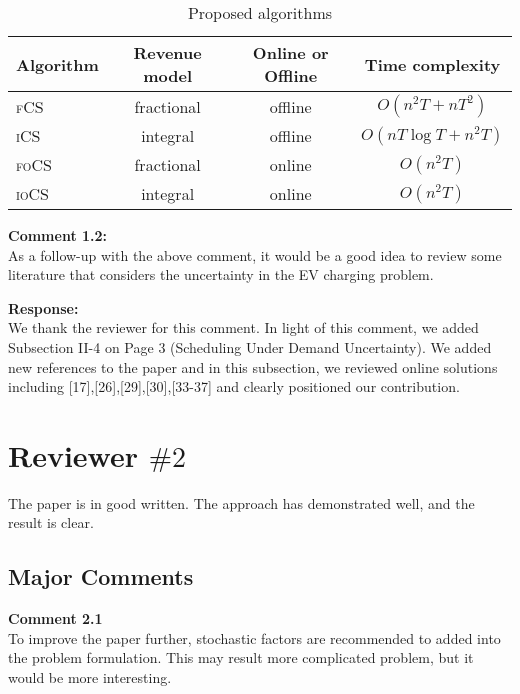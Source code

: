 \documentclass[11pt]{article}
\newcommand{\focs}{\textsc{foCS}\xspace}
\newcommand{\iocs}{\textsc{ioCS}\xspace}
\newcommand{\fcs}{\textsc{fCS}\xspace}
\newcommand{\ics}{\textsc{iCS}\xspace}
\begin{document}
	\begin{table}[h]
		\centering
		\vspace{3mm}
		\caption{Proposed algorithms}
		\label{tbl:tbl1}
		\begin{tabular}{ | l | c | c | c |}
			\hline
			\textbf{Algorithm} & Revenue model & Online or Offline & \textbf{Time complexity} \\ \hline\hline    
			\fcs& fractional& offline& $O(n^2T+nT^2)$\\\hline  
			\ics& integral& offline& $O(nT\log T+n^2T)$ \\\hline 
			\focs& fractional& online& $O(n^2T)$\\\hline 
			\iocs& integral&  online& $O(n^2T)$\\\hline
		\end{tabular}
	\end{table}
\vspace{5mm}
\renewcommand{\thetable}{\Alph{table}}
\vspace{4mm}
{\color{blue}
\noindent\textbf{Comment 1.2:}\\
 As a follow-up with the above comment, it would be a good idea to review some literature that considers the uncertainty in the EV charging problem.}

\vspace{7mm}
\noindent\textbf{Response:}\\
We thank the reviewer for this comment. In light of this comment, we added Subsection II-4 on Page $3$ (Scheduling Under Demand Uncertainty). We added new references to the paper and in this subsection, we reviewed online solutions including [17],[26],[29],[30],[33-37] and clearly positioned our contribution. 
\newpage
\section{Reviewer $\# 2$}
{\color{blue}The paper is in good written. The approach has demonstrated well, and the result is clear.}

\subsection{Major Comments}

\vspace{5mm}
{\color{blue}
\noindent\textbf{Comment 2.1}\\
To improve the paper further, stochastic factors are recommended to added into the problem formulation. This may result more complicated problem, but it would be more interesting.}
\end{document}
